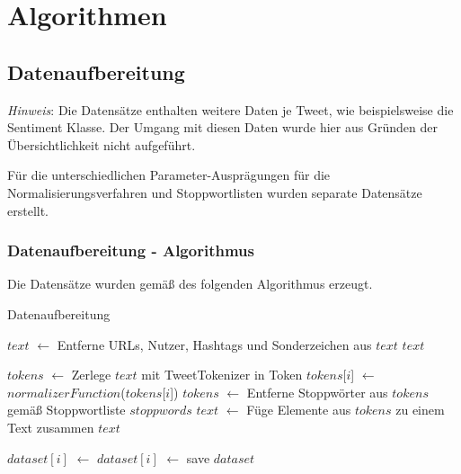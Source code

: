\section{Algorithmen}

\subsection{Datenaufbereitung}\label{subsec:appendix-data-preparation}

\textit{Hinweis}: Die Datensätze enthalten weitere Daten je Tweet, wie beispielsweise die Sentiment Klasse.
Der Umgang mit diesen Daten wurde hier aus Gründen der Übersichtlichkeit nicht aufgeführt.

Für die unterschiedlichen Parameter-Ausprägungen für die Normalisierungsverfahren und Stoppwortlisten wurden separate Datensätze erstellt.

\subsubsection{Datenaufbereitung - Algorithmus}
Die Datensätze wurden gemäß des folgenden Algorithmus erzeugt.
\begin{algorithm}
    \caption{Datenaufbereitung}
    \begin{algorithmic}[1]
                \State $text$ $\gets$ Entferne URLs, Nutzer, Hashtags und Sonderzeichen aus $text$
                \State \Return $text$
            \EndFunction

                \State $tokens$ $\gets$ Zerlege $text$ mit TweetTokenizer in Token
                    \State $tokens$[$i$] $\gets$ $normalizerFunction$($tokens$[$i$])
                \EndFor
                \State $tokens$ $\gets$ Entferne Stoppwörter aus $tokens$ gemäß Stoppwortliste $stoppwords$
                \State $text$ $\gets$ Füge Elemente aus $tokens$ zu einem Text zusammen
                \State \Return $text$
            \EndFunction

                \State $dataset[i]$ $\gets$ 
                \State $dataset[i]$ $\gets$ 
            \EndFor
            \State save $dataset$
        \EndProcedure
    \end{algorithmic}
    \label{alg:data-preparation}
\end{algorithm}

